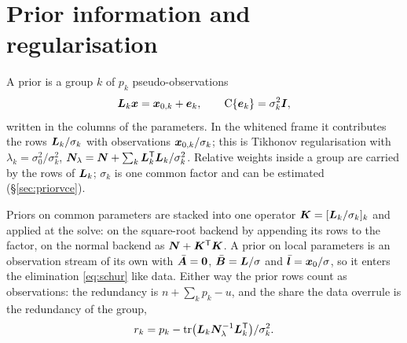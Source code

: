 \section{Prior information and regularisation}\label{sec:priors}

A prior is a group $k$ of $p_k$ pseudo-observations
\begin{equation}\label{eq:prior}
\bm{L}_k\bm{x}=\bm{x}_{0,k}+\bm{e}_k,\qquad \mathrm C\{\bm{e}_k\}=\sigma_k^2\bm{I} ,
\end{equation}
written in the columns of the parameters. In the whitened frame it contributes the rows
$\bm{L}_k/\sigma_k$ with observations $\bm{x}_{0,k}/\sigma_k$; this is Tikhonov regularisation with
$\lambda_k=\sigma_0^2/\sigma_k^2$, $\bm{N}_\lambda=\bm{N}+\sum_k\bm{L}_k^{\mathsf T}\bm{L}_k/\sigma_k^2$.
Relative weights inside a group are carried by the rows of $\bm{L}_k$; $\sigma_k$ is one common
factor and can be estimated (\S\ref{sec:priorvce}).

Priors on common parameters are stacked into one operator $\bm{K}=[\bm{L}_k/\sigma_k]_k$ and
applied at the solve: on the square-root backend by appending its rows to the factor, on the
normal backend as $\bm{N}+\bm{K}^{\mathsf T}\bm{K}$. A prior on local parameters is an observation stream of
its own with $\bar{\bm{A}}=\bm{0}$, $\bar{\bm{B}}=\bm{L}/\sigma$ and $\bar{\bm{l}}=\bm{x}_0/\sigma$, so it
enters the elimination \eqref{eq:schur} like data. Either way the prior rows count as
observations: the redundancy is $n+\sum_k p_k-u$, and the share the data overrule is the
redundancy of the group,
\begin{equation}\label{eq:priorred}
r_k=p_k-\operatorname{tr}\bigl(\bm{L}_k\bm{N}_\lambda^{-1}\bm{L}_k^{\mathsf T}\bigr)/\sigma_k^2 .
\end{equation}

